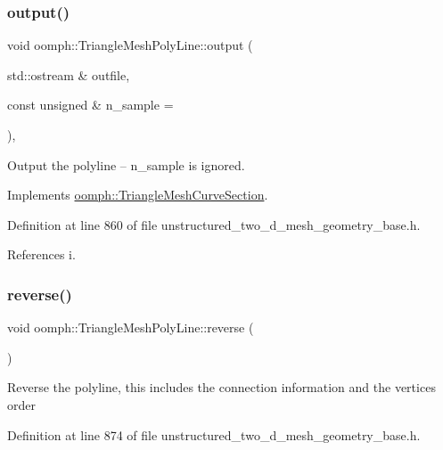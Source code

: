 \subsubsection{\texorpdfstring{output()}{output()}}
{\footnotesize\ttfamily void oomph\+::\+Triangle\+Mesh\+Poly\+Line\+::output (\begin{DoxyParamCaption}\item[{std\+::ostream \&}]{outfile,  }\item[{const unsigned \&}]{n\+\_\+sample = {} }\end{DoxyParamCaption})\hspace{0.3cm}{\ttfamily [inline]}, {\ttfamily [virtual]}}



Output the polyline -- n\+\_\+sample is ignored. 



Implements \hyperlink{classoomph_1_1TriangleMeshCurveSection_a140b0bb85d7bf85cc025e19e996d5c53}{oomph\+::\+Triangle\+Mesh\+Curve\+Section}.



Definition at line 860 of file unstructured\+\_\+two\+\_\+d\+\_\+mesh\+\_\+geometry\+\_\+base.\+h.



References i.

\mbox{\label{classoomph_1_1TriangleMeshPolyLine_aaf93f024dbc779f5b5448daccfa6fe7c}} 
\subsubsection{\texorpdfstring{reverse()}{reverse()}}
{\footnotesize\ttfamily void oomph\+::\+Triangle\+Mesh\+Poly\+Line\+::reverse (\begin{DoxyParamCaption}{ }\end{DoxyParamCaption})\hspace{0.3cm}{\ttfamily [inline]}}

Reverse the polyline, this includes the connection information and the vertices order 

Definition at line 874 of file unstructured\+\_\+two\+\_\+d\+\_\+mesh\+\_\+geometry\+\_\+base.\+h.




